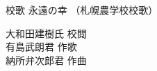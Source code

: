 \documentclass[10pt,b5j]{tarticle} %
\begin{document}
\begin{minipage}[c]{0.7\hsize} %
    \begin{center}
        {\normalsize 
        	校歌
        }
        {\LARGE
            永遠の幸 %
        }
        {\small 
            （札幌農学校校歌） %
        }
    \end{center}
\end{minipage}
\begin{minipage}[c]{0.3\hsize} %
    \begin{flushright} %
        大和田建樹氏 校閲\\有島武朗君 作歌\\納所弁次郎君 作曲 %
    \end{flushright}
\end{minipage}
\end{document}
